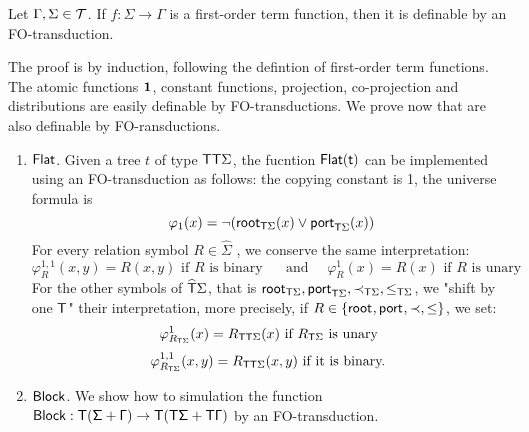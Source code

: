 \begin{proposition}
Let $\Gamma, \Sigma \in {\mathcal T}$. If $f:\Sigma\to\Gamma$ is a first-order term function, then it is definable by an FO-transduction. 
\end{proposition}

\begin{pr}
The proof is by induction, following the defintion of first-order term functions. The atomic functions $\mathbf{1}$, constant functions, projection, co-projection and distributions are easily definable by FO-transductions.  
We prove now that are also definable by FO-ransductions. 
\\

\begin{enumerate}
\item $\sf{Flat}$. Given a tree $t$ of type $\mathsf T\mathsf T\Sigma$, the fucntion $\sf{Flat}(t)$ can be implemented using an FO-transduction as follows: the copying constant is 1, the universe formula is 
\[\varphi_1(x) = \neg (\mathsf{root}_{\mathsf T\Sigma}(x) \vee \mathsf{port}_{\mathsf T\Sigma}(x) )  \]
For every relation symbol $R\in\hat \Sigma$ , we conserve the same interpretation:
\[\varphi_R^{1,1}(x,y)=R(x,y) \text{ if $R$ is binary }
\quad \text{ and } \quad\varphi_R^{1}(x)=R(x) \text{ if $R$ is unary }\] 
For the other symbols of $\widehat{\mathsf T}\Sigma$, that is $\mathsf{root}_{\mathsf T\Sigma},\mathsf{port}_{\mathsf T\Sigma}, \prec_{\mathsf T\Sigma}, \leq_{\mathsf T\Sigma}$, we "shift by one $\mathsf T$" their interpretation, more precisely, if $R\in\{\mathsf{root}_{}, \mathsf{port}_{}, \prec, \leq\}$, we set:
\[ \varphi^1_{R_{\mathsf T\Sigma}}(x) = R_{\mathsf T\mathsf T\Sigma}(x) \text{ if $R_{\mathsf T\Sigma}$ is unary } \]
\[\varphi^{1,1}_{R_{\mathsf T\Sigma}}(x,y) = R_{\mathsf T\mathsf T\Sigma}(x,y) \text{ if it is binary. }\] 
\item $\sf{Block}$. We show how to simulation the function $\sf{Block}:\mathsf T (\Sigma + \Gamma) \to \mathsf T (\mathsf T \Sigma + \mathsf T \Gamma)$ by an FO-transduction. 
\end{enumerate} 

 \end{pr}